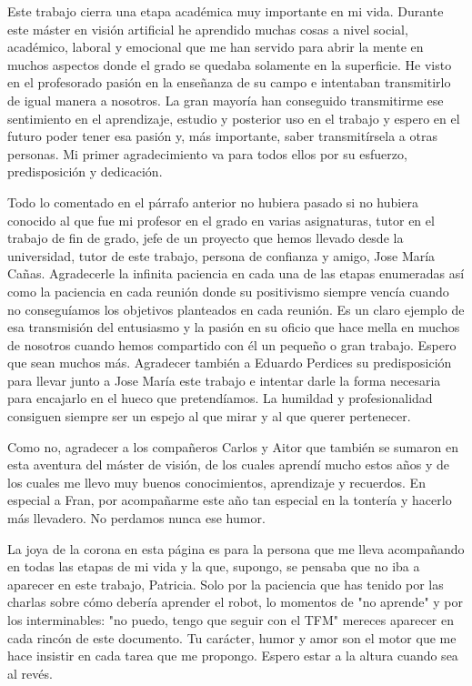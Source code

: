 Este trabajo cierra una etapa académica muy importante en mi vida. Durante este máster en visión artificial he aprendido muchas cosas a nivel social, académico, laboral y emocional que me han servido para abrir la mente en muchos aspectos donde el grado se quedaba solamente en la superficie. He visto en el profesorado pasión en la enseñanza de su campo e intentaban transmitirlo de igual manera a nosotros. La gran mayoría han conseguido transmitirme ese sentimiento en el aprendizaje, estudio y posterior uso en el trabajo y espero en el futuro poder tener esa pasión y, más importante, saber transmitírsela a otras personas. Mi primer agradecimiento va para todos ellos por su esfuerzo, predisposición y dedicación.

Todo lo comentado en el párrafo anterior no hubiera pasado si no hubiera conocido al que fue mi profesor en el grado en varias asignaturas, tutor en el trabajo de fin de grado, jefe de un proyecto que hemos llevado desde la universidad, tutor de este trabajo, persona de confianza y amigo, Jose María Cañas. Agradecerle la infinita paciencia en cada una de las etapas enumeradas así como la paciencia en cada reunión donde su positivismo siempre vencía cuando no conseguíamos los objetivos planteados en cada reunión. Es un claro ejemplo de esa transmisión del entusiasmo y la pasión en su oficio que hace mella en muchos de nosotros cuando hemos compartido con él un pequeño o gran trabajo. Espero que sean muchos más. Agradecer también a Eduardo Perdices su predisposición para llevar junto a Jose María este trabajo e intentar darle la forma necesaria para encajarlo en el hueco que pretendíamos. La humildad y profesionalidad consiguen siempre ser un espejo al que mirar y al que querer pertenecer.

Como no, agradecer a los compañeros Carlos y Aitor que también se sumaron en esta aventura del máster de visión, de los cuales aprendí mucho estos años y de los cuales me llevo muy buenos conocimientos, aprendizaje y recuerdos. En especial a Fran, por acompañarme este año tan especial en la tontería y hacerlo más llevadero. No perdamos nunca ese humor.

La joya de la corona en esta página es para la persona que me lleva acompañando en todas las etapas de mi vida y la que, supongo, se pensaba que no iba a aparecer en este trabajo, Patricia. Solo por la paciencia que has tenido por las charlas sobre cómo debería aprender el robot, lo momentos de "no aprende" y por los interminables: "no puedo, tengo que seguir con el TFM" mereces aparecer en cada rincón de este documento. Tu carácter, humor y amor son el motor que me hace insistir en cada tarea que me propongo. Espero estar a la altura cuando sea al revés.